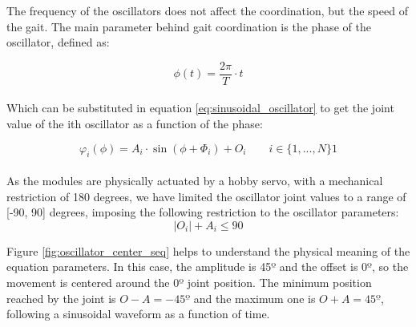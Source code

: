 The frequency of the oscillators does not affect the coordination, but the speed of the gait. The main parameter behind gait coordination is the phase of the oscillator, defined as:

\begin{equation} \label{eq:phase_of_time}
\phi(t) = \frac{2\pi}{T} \cdot t
\end{equation}\\

Which can be substituted in equation \ref{eq:sinusoidal_oscillator} to get the joint value of the ith oscillator as a function of the phase:

\begin{equation} \label{eq:sinusoidal_oscillator_phase}
\varphi_i(\phi) = A_i \cdot \sin{\left( \phi + \Phi_i \right)} + O_i \qquad i \in \lbrace 1, ..., N \rbrace 1
\end{equation}\\

As the modules are physically actuated by a hobby servo, with a mechanical restriction of 180 degrees, we have limited the oscillator joint values to  a range of [-90, 90] degrees, imposing the following restriction to the oscillator parameters:
\begin{equation} \label{eq:oscillator_restriction}
|O_i| + A_i \leq 90
\end{equation}

Figure \ref{fig:oscillator_center_seq} helps to understand the physical meaning of the equation parameters. In this case, the amplitude is 45º and the offset is 0º, so the movement is centered around the 0º joint position. The minimum position reached by the joint is $ O - A = -45º$ and the maximum one is $O + A = 45º$, following a sinusoidal waveform as a function of time.\\

